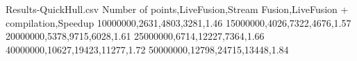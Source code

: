 \begin{filecontents*}{Results-QuickHull.csv}
Number of points,LiveFusion,Stream Fusion,LiveFusion + compilation,Speedup
10000000,2631,4803,3281,1.46
15000000,4026,7322,4676,1.57
20000000,5378,9715,6028,1.61
25000000,6714,12227,7364,1.66
40000000,10627,19423,11277,1.72
50000000,12798,24715,13448,1.84
\end{filecontents*}